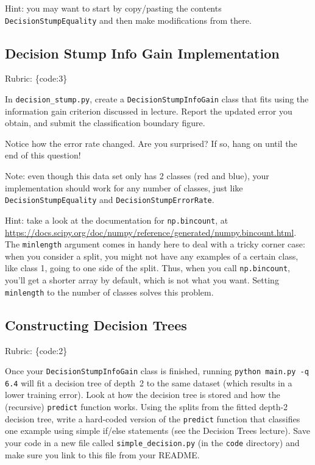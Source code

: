 \documentclass{article}
\def\rubric#1{\gre{Rubric: \{#1\}}}{}
\def\blu#1{{\color{blu}#1}}
\def\gre#1{{\color{gre}#1}}
\begin{document}
Hint: you may want to start by copy/pasting the contents \texttt{DecisionStumpEquality} and then make modifications from there. 


\subsection{Decision Stump Info Gain Implementation}
\rubric{code:3}

In \texttt{decision\string_stump.py}, \blu{create a \texttt{DecisionStumpInfoGain} class that 
fits using the information gain criterion discussed in lecture. Report the updated error you obtain, and submit the classification boundary figure.}

Notice how the error rate changed. Are you surprised? If so, hang on until the end of this question!

Note: even though this data set only has 2 classes (red and blue), your implementation should work 
for any number of classes, just like \texttt{DecisionStumpEquality} and \texttt{DecisionStumpErrorRate}.

Hint: take a look at the documentation for \texttt{np.bincount}, at \\
\url{https://docs.scipy.org/doc/numpy/reference/generated/numpy.bincount.html}. 
The \texttt{minlength} argument comes in handy here to deal with a tricky corner case:
when you consider a split, you might not have any examples of a certain class, like class 1,
going to one side of the split. Thus, when you call \texttt{np.bincount}, you'll get
a shorter array by default, which is not what you want. Setting \texttt{minlength} to the 
number of classes solves this problem.

\subsection{Constructing Decision Trees}
\rubric{code:2}

Once your \texttt{DecisionStumpInfoGain} class is finished, running \texttt{python main.py -q 6.4} will fit
a decision tree of depth~2 to the same dataset (which results in a lower training error).
Look at how the decision tree is stored and how the (recursive) \texttt{predict} function works.
\blu{Using the splits from the fitted depth-2 decision tree, write a hard-coded version of the \texttt{predict}
function that classifies one example using simple if/else statements
(see the Decision Trees lecture).} Save your code in a new file called
\texttt{simple\string_decision.py} (in the \texttt{code} directory) and make sure you link to this file from your README.
\end{document}
